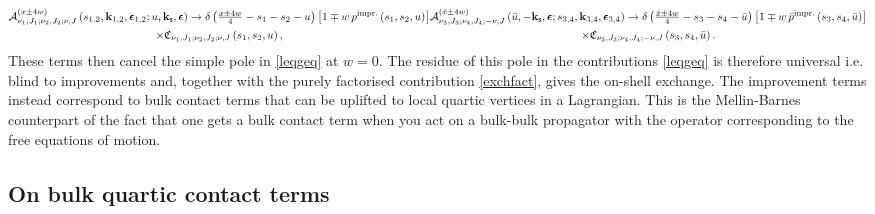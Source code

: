\documentclass[11pt,a4paper]{article}
\begin{document}
\begin{subequations}\label{4ptimprove}
\begin{multline}\label{4ptimprovep}
    {\cal A}^{\left(x \pm 4w\right)}_{\nu_1,J_1;\nu_2,J_2;\nu,J}\left(s_{1,2},{\bf k}_{1,2},\boldsymbol{\epsilon}_{1,2};u,{\bf k}_{\sf s},\boldsymbol{\epsilon}\right) \to \delta\left(\tfrac{x\pm 4w}{4}-s_1-s_2-u\right)\left[1\mp w \, p^{\text{impr.}}\left(s_1,s_2,u\right)\right]\\ \times  \mathfrak{C}_{\nu_1,J_1;\nu_2,J_2;\nu,J}\left(s_1,s_2,u\right),
\end{multline}
\begin{multline}\label{4ptimprovepbar}
   {\cal A}^{({\bar x} \pm 4w)}_{\nu_3,J_3;\nu_4,J_4;-\nu,J}\left({\bar u},-{\bf k}_{\sf s},\boldsymbol{\epsilon};s_{3,4},{\bf k}_{3,4},\boldsymbol{\epsilon}_{3,4}\right) \to \delta\left(\tfrac{{\bar x}\pm 4w}{4}-s_3-s_4-{\bar u}\right)\left[1\mp w \, {\bar p}^{\text{impr.}}\left(s_3,s_4,{\bar u}\right)\right]\\ \times  \mathfrak{C}_{\nu_3,J_3;\nu_4,J_4;-\nu,J}\left(s_3,s_4,{\bar u}\right).
\end{multline}
\end{subequations}
These terms then cancel the simple pole in \eqref{leqgeq} at $w=0$. The residue of this pole in the contributions \eqref{leqgeq} is therefore universal i.e. blind to improvements and, together with the purely factorised contribution \eqref{exchfact}, gives the on-shell exchange. The improvement terms instead correspond to bulk contact terms that can be uplifted to local quartic vertices in a Lagrangian. This is the Mellin-Barnes counterpart of the fact that one gets a bulk contact term when you act on a bulk-bulk propagator with the operator corresponding to the free equations of motion. 

\subsection{On bulk quartic contact terms}\label{ContactTerms}
\end{document}

